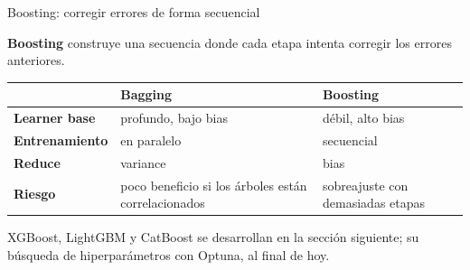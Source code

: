 \documentclass[aspectratio=169,12pt]{beamer}
\newcommand{\hrow}{\rowcolor{mlcream}}
\begin{document}
\begin{frame}{Boosting: corregir errores de forma secuencial}
  \begin{center}
    \textbf{Boosting} construye una secuencia donde cada etapa intenta corregir los errores anteriores.
  \end{center}
  \centering\small
  \begin{tabular}{@{}l L{0.3\textwidth} L{0.3\textwidth}@{}}
    \toprule
    \hrow & Bagging & Boosting \\
    \midrule
    \textbf{Learner base} & profundo, bajo bias & débil, alto bias \\
    \textbf{Entrenamiento} & en paralelo & secuencial \\
    \textbf{Reduce} & variance & bias \\
    \textbf{Riesgo} & poco beneficio si los árboles están correlacionados & sobreajuste con demasiadas etapas \\
    \bottomrule
  \end{tabular}
  \raggedright
  \begin{rulebox}[Frontera]
    \small XGBoost, LightGBM y CatBoost se desarrollan en la sección siguiente; su búsqueda de hiperparámetros con Optuna, al final de hoy.
  \end{rulebox}
\end{frame}
\end{document}
